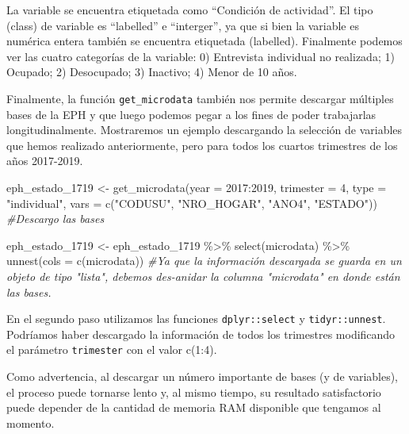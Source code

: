 \documentclass[
]{book}
\newenvironment{Shaded}{\begin{snugshade}}{\end{snugshade}}
\newcommand{\AttributeTok}[1]{\textcolor[rgb]{0.77,0.63,0.00}{#1}}
\newcommand{\CommentTok}[1]{\textcolor[rgb]{0.56,0.35,0.01}{\textit{#1}}}
\newcommand{\DecValTok}[1]{\textcolor[rgb]{0.00,0.00,0.81}{#1}}
\newcommand{\FunctionTok}[1]{\textcolor[rgb]{0.00,0.00,0.00}{#1}}
\newcommand{\NormalTok}[1]{#1}
\newcommand{\OtherTok}[1]{\textcolor[rgb]{0.56,0.35,0.01}{#1}}
\newcommand{\SpecialCharTok}[1]{\textcolor[rgb]{0.00,0.00,0.00}{#1}}
\newcommand{\StringTok}[1]{\textcolor[rgb]{0.31,0.60,0.02}{#1}}
\begin{document}
La variable se encuentra etiquetada como ``Condición de actividad''. El tipo (class) de variable es ``labelled'' e ``interger'', ya que si bien la variable es numérica entera también se encuentra etiquetada (labelled). Finalmente podemos ver las cuatro categorías de la variable: 0) Entrevista individual no realizada; 1) Ocupado; 2) Desocupado; 3) Inactivo; 4) Menor de 10 años.

Finalmente, la función \texttt{get\_microdata} también nos permite descargar múltiples bases de la EPH y que luego podemos pegar a los fines de poder trabajarlas longitudinalmente. Mostraremos un ejemplo descargando la selección de variables que hemos realizado anteriormente, pero para todos los cuartos trimestres de los años 2017-2019.

\begin{Shaded}
\begin{Highlighting}[]
\NormalTok{eph\_estado\_1719 }\OtherTok{\textless{}{-}} \FunctionTok{get\_microdata}\NormalTok{(}\AttributeTok{year =} \DecValTok{2017}\SpecialCharTok{:}\DecValTok{2019}\NormalTok{, }\AttributeTok{trimester =} \DecValTok{4}\NormalTok{, }\AttributeTok{type =} \StringTok{"individual"}\NormalTok{, }\AttributeTok{vars =} \FunctionTok{c}\NormalTok{(}\StringTok{"CODUSU"}\NormalTok{, }\StringTok{"NRO\_HOGAR"}\NormalTok{, }\StringTok{"ANO4"}\NormalTok{, }\StringTok{"ESTADO"}\NormalTok{)) }\CommentTok{\#Descargo las bases}

\NormalTok{eph\_estado\_1719 }\OtherTok{\textless{}{-}}\NormalTok{ eph\_estado\_1719 }\SpecialCharTok{\%\textgreater{}\%}
  \FunctionTok{select}\NormalTok{(microdata) }\SpecialCharTok{\%\textgreater{}\%}
  \FunctionTok{unnest}\NormalTok{(}\AttributeTok{cols =} \FunctionTok{c}\NormalTok{(microdata)) }\CommentTok{\#Ya que la información descargada se guarda en un objeto de tipo "lista", debemos des{-}anidar la columna "microdata" en donde están las bases.}
\end{Highlighting}
\end{Shaded}

En el segundo paso utilizamos las funciones \texttt{dplyr::select} y \texttt{tidyr::unnest}. Podríamos haber descargado la información de todos los trimestres modificando el parámetro \texttt{trimester} con el valor c(1:4).

Como advertencia, al descargar un número importante de bases (y de variables), el proceso puede tornarse lento y, al mismo tiempo, su resultado satisfactorio puede depender de la cantidad de memoria RAM disponible que tengamos al momento.
\end{document}

